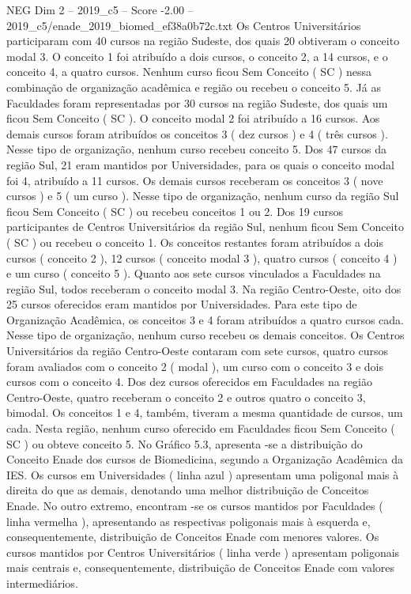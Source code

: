 \begin{textsample}{NEG Dim 2 – 2019\_c5 – Score -2.00 – 2019\_c5/enade\_2019\_biomed\_ef38a0b72c.txt}
Os Centros Universitários participaram com 40 cursos na região Sudeste, dos quais 20 obtiveram o conceito modal 3.
O conceito 1 foi atribuído a dois cursos, o conceito 2, a 14 cursos, e o conceito 4, a quatro cursos.
Nenhum curso ficou Sem Conceito ( SC ) nessa combinação de organização acadêmica e região ou recebeu o conceito 5.
Já as Faculdades foram representadas por 30 cursos na região Sudeste, dos quais um ficou Sem Conceito ( SC ).
O conceito modal 2 foi atribuído a 16 cursos.
Aos demais cursos foram atribuídos os conceitos 3 ( dez cursos ) e 4 ( três cursos ).
Nesse tipo de organização, nenhum curso recebeu conceito 5.
Dos 47 cursos da região Sul, 21 eram mantidos por Universidades, para os quais o conceito modal foi 4, atribuído a 11 cursos.
Os demais cursos receberam os conceitos 3 ( nove cursos ) e 5 ( um curso ).
Nesse tipo de organização, nenhum curso da região Sul ficou Sem Conceito ( SC ) ou recebeu conceitos 1 ou 2.
Dos 19 cursos participantes de Centros Universitários da região Sul, nenhum ficou Sem Conceito ( SC ) ou recebeu o conceito 1.
Os conceitos restantes foram atribuídos a dois cursos ( conceito 2 ), 12 cursos ( conceito modal 3 ), quatro cursos ( conceito 4 ) e um curso ( conceito 5 ).
Quanto aos sete cursos vinculados a Faculdades na região Sul, todos receberam o conceito modal 3.
Na região Centro-Oeste, oito dos 25 cursos oferecidos eram mantidos por Universidades.
Para este tipo de Organização Acadêmica, os conceitos 3 e 4 foram atribuídos a quatro cursos cada.
Nesse tipo de organização, nenhum curso recebeu os demais conceitos.
Os Centros Universitários da região Centro-Oeste contaram com sete cursos, quatro cursos foram avaliados com o conceito 2 ( modal ), um curso com o conceito 3 e dois cursos com o conceito 4.
Dos dez cursos oferecidos em Faculdades na região Centro-Oeste, quatro receberam o conceito 2 e outros quatro o conceito 3, bimodal.
Os conceitos 1 e 4, também, tiveram a mesma quantidade de cursos, um cada.
Nesta região, nenhum curso oferecido em Faculdades ficou Sem Conceito ( SC ) ou obteve conceito 5.
No Gráfico 5.3, apresenta -se a distribuição do Conceito Enade dos cursos de Biomedicina, segundo a Organização Acadêmica da IES.
Os cursos em Universidades ( linha azul ) apresentam uma poligonal mais à direita do que as demais, denotando uma melhor distribuição de Conceitos Enade.
No outro extremo, encontram -se os cursos mantidos por Faculdades ( linha vermelha ), apresentando as respectivas poligonais mais à esquerda e, consequentemente, distribuição de Conceitos Enade com menores valores.
Os cursos mantidos por Centros Universitários ( linha verde ) apresentam poligonais mais centrais e, consequentemente, distribuição de Conceitos Enade com valores intermediários.

\end{textsample}
